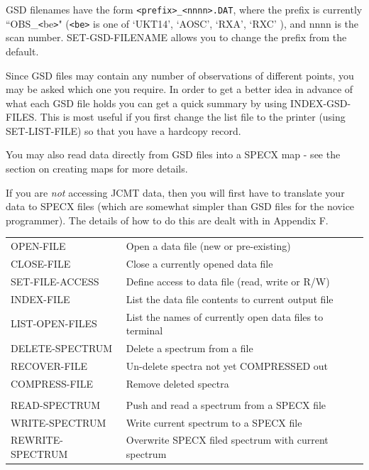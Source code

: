 \documentclass[11pt,twoside]{report}
\begin{document}
GSD filenames have the form \verb+<prefix>_<nnnn>.DAT+, where the
prefix is currently ``OBS\_\verb+<+be\verb+>+"  (\verb+<be>+ is one of
`UKT14', `AOSC', `RXA', `RXC' \etc), and nnnn is the scan number.
SET-GSD-FILENAME allows you to change the prefix from the default. 

Since GSD files may contain any number of observations of
different points, you may be asked which one you require. In order to get a
better idea in advance of what each GSD file holds you can get a quick summary
by using INDEX-GSD-FILES. This is most useful if you first change the list file
to the printer (using SET-LIST-FILE) so that you have a hardcopy record.

You may also read data directly from GSD files into a SPECX map - see the 
section on creating maps for more details.

If you are {\em not} accessing JCMT data, then you will first have to translate
your data to SPECX files (which are somewhat simpler than GSD files for the
novice programmer). The details of how to do this are dealt with in Appendix
F.

\begin{tabular}{ll}
OPEN-FILE              & Open a data file (new or pre-existing)\\
CLOSE-FILE             & Close a currently opened data file\\
SET-FILE-ACCESS        & Define access to data file (read, write or R/W)\\
INDEX-FILE             & List the data file contents to current output file\\
LIST-OPEN-FILES        & List the names of currently open data files to terminal\\
DELETE-SPECTRUM        & Delete a spectrum from a file\\
RECOVER-FILE           & Un-delete spectra not yet COMPRESSED out\\
COMPRESS-FILE          & Remove deleted spectra\\
\\
READ-SPECTRUM          & Push and read a spectrum from a SPECX file \\
WRITE-SPECTRUM         & Write current spectrum to a SPECX file\\
REWRITE-SPECTRUM       & Overwrite SPECX filed spectrum with current spectrum\\
\end{tabular}
\end{document}
